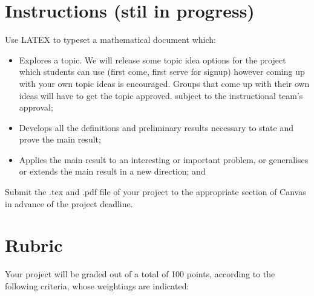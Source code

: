 \documentclass{article}
\begin{document}
\section*{Instructions (stil in progress)}
    Use LATEX to typeset a mathematical document which:
    \begin{itemize}
        \item Explores a topic. We will release some topic idea options for the project which students can use (first come, first serve for signup) however coming up with your own topic ideas is encouraged. Groups that come up with their own ideas will have to get the topic approved. subject to the instructional team's approval;
        \item Develops all the definitions and preliminary results necessary to state and prove the main result;
        \item Applies the main result to an interesting or important problem, or generalises or extends the main result in a new direction; and
    \end{itemize}
    Submit the .tex and .pdf file of your project to the appropriate section of Canvas in advance of the project deadline.

\section*{Rubric}
Your project will be graded out of a total of 100 points, according to the following criteria, whose weightings are indicated:
\end{document}
